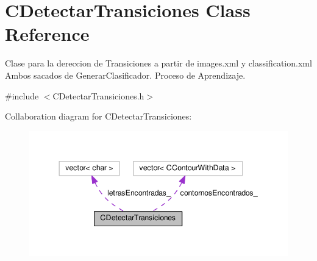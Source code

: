 \hypertarget{classCDetectarTransiciones}{}\section{C\+Detectar\+Transiciones Class Reference}
\label{classCDetectarTransiciones}


Clase para la dereccion de Transiciones a partir de images.\+xml y classification.\+xml Ambos sacados de Generar\+Clasificador. Proceso de Aprendizaje.  




{\ttfamily \#include $<$C\+Detectar\+Transiciones.\+h$>$}



Collaboration diagram for C\+Detectar\+Transiciones\+:
\nopagebreak
\begin{figure}[H]
\begin{center}
\leavevmode
\includegraphics[width=344pt]{classCDetectarTransiciones__coll__graph}
\end{center}
\end{figure}
